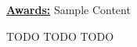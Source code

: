 \documentclass[letterpaper,10pt]{article}
\begin{document}
\noindent
\textbf{\underline{Awards:}}\hspace{4.4em}%
%
Sample Content
%
\begin{adjustwidth}{1.2in}{0in}
	TODO\break
	TODO\break
	TODO
\end{adjustwidth}
\end{document}
